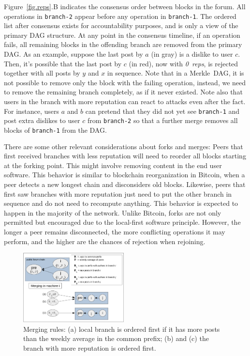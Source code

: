 \documentclass[10pt,journal,compsoc]{IEEEtran}
\newcommand{\nreps}[1] {\emph{#1~reps\xspace}}
\newcommand{\code}[1]  {\texttt{\footnotesize{#1}}}
\begin{document}
Figure~\ref{fig.reps}.B indicates the consensus order between blocks in the
forum.
All operations in \code{branch-2} appear before any operation in
\code{branch-1}.
The ordered list after consensus exists for accountability purposes, and is
only a view of the primary DAG structure.
At any point in the consensus timeline, if an operation fails, all remaining
blocks in the offending branch are removed from the primary DAG.
As an example, suppose the last post by $a$ (in gray) is a dislike to user $c$.
Then, it's possible that the last post by $c$ (in red), now with \nreps{0}, is
rejected together with all posts by $y$ and $x$ in sequence.
%
Note that in a Merkle~DAG, it is not possible to remove only the block with the
failing operation, instead, we need to remove the remaining branch completely,
as if it never existed.
%
Note also that users in the branch with more reputation can react to attacks
even after the fact.
For instance, users $a$ and $b$ can pretend that they did not yet see
\code{branch-1} and post extra dislikes to user $c$ from \code{branch-2} so
that a further merge removes all blocks of \code{branch-1} from the DAG.

There are some other relevant considerations about forks and merges:
%
Peers that first received branches with less reputation will need to reorder
all blocks starting at the forking point.
This might involve removing content in the end user software.
This behavior is similar to blockchain reorganization in Bitcoin, when a peer
detects a new longest chain and disconsiders old blocks.
%
Likewise, peers that first saw branches with more reputation just need to put
the other branch in sequence and do not need to recompute anything.
This behavior is expected to happen in the majority of the network.
%
Unlike Bitcoin, forks are not only permitted but encouraged due to the
local-first software principle.
However, the longer a peer remains disconnected, the more conflicting
operations it may perform, and the higher are the chances of rejection when
rejoining.

\begin{figure}
\centering
\includegraphics[width=0.49\textwidth]{merge.png}
\caption{
    Merging rules:
    (a) local branch is ordered first if it has more posts than the weekly
        average in the common prefix;
    (b) and (c) the branch with more reputation is ordered first.
}
\label{fig.merge}
\end{figure}
\end{document}
